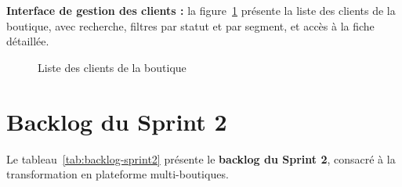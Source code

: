 \textbf{Interface de gestion des clients :} la figure~\ref{fig:ui-clients} présente la liste des clients de la boutique, avec recherche, filtres par statut et par segment, et accès à la fiche détaillée.
\begin{figure}[H]
    \centering
    \caption{Liste des clients de la boutique}
    \label{fig:ui-clients}
\end{figure}

\section{Backlog du Sprint 2}
Le tableau~\ref{tab:backlog-sprint2} présente le \textbf{backlog du Sprint 2}, consacré à la transformation en plateforme multi-boutiques.

